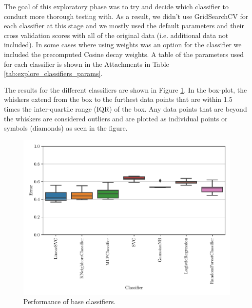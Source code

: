 The goal of this exploratory phase was to try and decide which classifier to conduct more thorough testing with. As a result, we didn't use GridSearchCV for each classifier at this stage and we mostly used the default parameters and their cross validation scores with all of the original data (i.e. additional data not included). In some cases where using weights was an option for the classifier we included the precomputed Cosine decay weights. A table of the parameters used for each classifier is shown in the Attachments in Table \ref{tab:explore_classifiers_params}.


The results for the different classifiers are shown in Figure \ref{fig:explore_classifiers}. In the box-plot, the whiskers extend from the box to the furthest data points that are within 1.5 times the inter-quartile range (IQR) of the box. Any data points that are beyond the whiskers are considered outliers and are plotted as individual points or symbols (diamonds) as seen in the figure.

\begin{figure}[ht]
  \centering
  \includegraphics[width=\textwidth]{../img/plot_explore_classifiers}
  \caption{Performance of base classifiers.}
  \label{fig:explore_classifiers}
\end{figure} 

